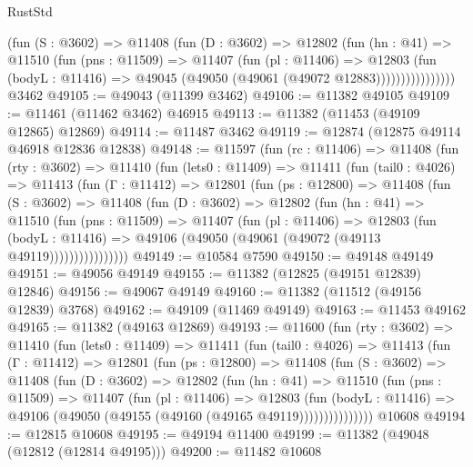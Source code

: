\begin{lexlean}{RustStd}
\begin{coremodule}
                  (fun (S : @3602) =>
                  @11408
                    (fun (D : @3602) =>
                    @12802
                      (fun (hn : @41) =>
                      @11510
                        (fun (pns : @11509) =>
                        @11407
                          (fun (pl : @11406) =>
                          @12803
                            (fun (bodyL : @11416) =>
                            @49045 (@49050 (@49061 (@49072 @12883))))))))))))))))
    @3462
@49105 := @49043 (@11399 @3462)
@49106 := @11382 @49105
@49109 := @11461 (@11462 @3462) @46915
@49113 := @11382 (@11453 (@49109 @12865) @12869)
@49114 := @11487 @3462
@49119 := @12874 (@12875 @49114 @46918 @12836 @12838)
@49148 := @11597
    (fun (rc : @11406) =>
    @11408
      (fun (rty : @3602) =>
      @11410
        (fun (lets0 : @11409) =>
        @11411
          (fun (tail0 : @4026) =>
          @11413
            (fun (Γ : @11412) =>
            @12801
              (fun (ps : @12800) =>
              @11408
                (fun (S : @3602) =>
                @11408
                  (fun (D : @3602) =>
                  @12802
                    (fun (hn : @41) =>
                    @11510
                      (fun (pns : @11509) =>
                      @11407
                        (fun (pl : @11406) =>
                        @12803
                          (fun (bodyL : @11416) =>
                          @49106 (@49050 (@49061 (@49072 (@49113 @49119))))))))))))))))
@49149 := @10584 @7590
@49150 := @49148 @49149
@49151 := @49056 @49149
@49155 := @11382 (@12825 (@49151 @12839) @12846)
@49156 := @49067 @49149
@49160 := @11382 (@11512 (@49156 @12839) @3768)
@49162 := @49109 (@11469 @49149)
@49163 := @11453 @49162
@49165 := @11382 (@49163 @12869)
@49193 := @11600
    (fun (rty : @3602) =>
    @11410
      (fun (lets0 : @11409) =>
      @11411
        (fun (tail0 : @4026) =>
        @11413
          (fun (Γ : @11412) =>
          @12801
            (fun (ps : @12800) =>
            @11408
              (fun (S : @3602) =>
              @11408
                (fun (D : @3602) =>
                @12802
                  (fun (hn : @41) =>
                  @11510
                    (fun (pns : @11509) =>
                    @11407
                      (fun (pl : @11406) =>
                      @12803
                        (fun (bodyL : @11416) =>
                        @49106 (@49050 (@49155 (@49160 (@49165 @49119)))))))))))))))
    @10608
@49194 := @12815 @10608
@49195 := @49194 @11400
@49199 := @11382 (@49048 (@12812 (@12814 @49195)))
@49200 := @11482 @10608

\end{coremodule}
\end{lexlean}
